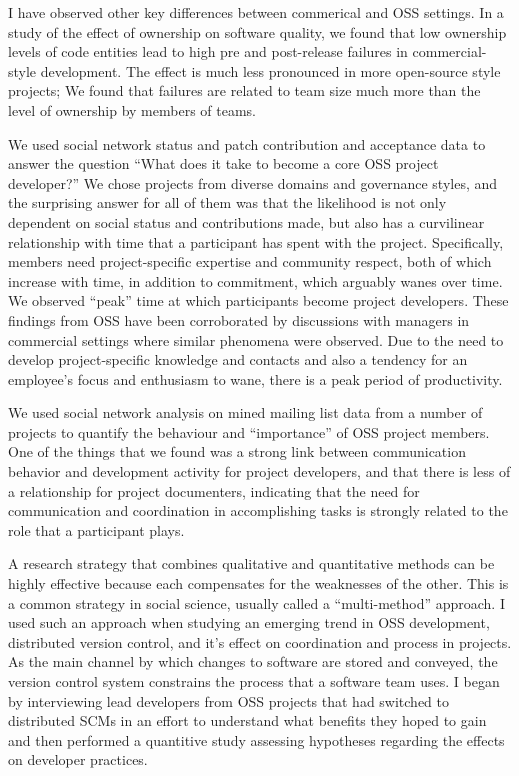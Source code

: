 \documentclass[10pt]{article}
\begin{document}
\begin{small}
I have observed other key differences between commerical and OSS settings.  In
a study of the effect of ownership on software quality, we found that low
ownership levels of code entities lead to high pre and post-release failures in
commercial-style development.  The effect is much less pronounced in more
open-source style projects; We found that failures are related to team size
much more than the level of ownership by members of teams.  

We used social network status and patch contribution and acceptance data to
answer the question ``What does it take to become a core OSS project
developer?'' We chose projects from diverse domains and governance styles, and
the surprising answer for all of them was that the likelihood is not only
dependent on social status and contributions made, but also has a curvilinear
relationship with time that a participant has spent with the project.
Specifically, members need project-specific expertise and community respect,
both of which increase with time, in addition to commitment, which arguably
wanes over time.  We observed ``peak'' time at which participants become
project developers.  These findings from OSS have been corroborated by
discussions with managers in commercial settings where similar phenomena were
observed.  Due to the need to develop project-specific knowledge and contacts
and also a tendency for an employee's focus and enthusiasm to wane, there is a
peak period of productivity.

We used social network analysis on mined mailing list data from a number of
projects to quantify the behaviour and ``importance'' of OSS project members.
One of the things that we found was a strong link between communication
behavior and development activity for project developers, and that there is
less of a relationship for project documenters, indicating that the need for
communication and coordination in accomplishing tasks is strongly related to
the role that a participant plays.

A research strategy that combines qualitative and quantitative methods can be
highly effective because each compensates for the weaknesses of the other.
This is a common strategy in social science, usually called a ``multi-method''
approach.  I used such an approach when studying an emerging trend in
OSS development, distributed version control, and it's effect on coordination
and process in projects.  As the main channel by which changes to software are
stored and conveyed, the version control system constrains the process that a
software team uses.  I began by interviewing lead developers from OSS projects
that had switched to distributed SCMs in an effort to understand what benefits
they hoped to gain and then performed a quantitive study assessing hypotheses
regarding the effects on developer practices.


\end{small}
\end{document}
